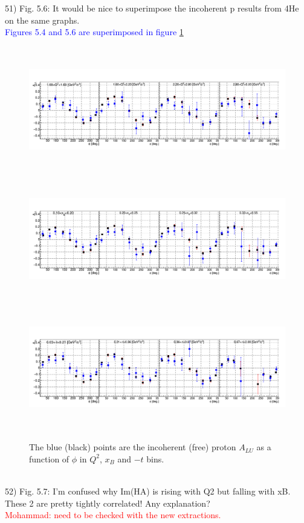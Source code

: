 51) Fig. 5.6: It would be nice to superimpose the incoherent p results from 4He 
on the same graphs.\\
\textcolor{blue}{ Figures 5.4 and 5.6 are superimposed in figure
\ref{fig:incoh_free_ALU}}
\begin{figure}[h!]

   \includegraphics[height=5.5cm]{fig/Q2_dep.png}
   \includegraphics[height=5.5cm]{fig/xB_dep.png}
   \includegraphics[height=5.5cm]{fig/t_dep.png}
   \caption{The blue (black) points are the incoherent (free) proton $A_{LU}$ 
   as a function of $\phi$ in $Q^{2}$, $x_{B}$ and $-t$ bins.}
   \label{fig:incoh_free_ALU}
\end{figure}
\\

52) Fig. 5.7: I'm confused why Im(HA) is rising with Q2 but falling with xB.  
These 2 are pretty tightly correlated! Any explanation?\\
\textcolor{red}{Mohammad: need to be checked with the new extractions.} \\

